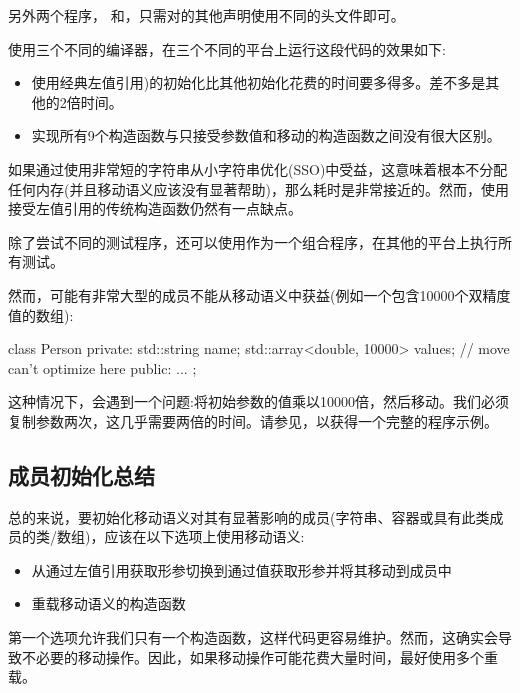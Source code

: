另外两个程序， 和，只需对的其他声明使用不同的头文件即可。

使用三个不同的编译器，在三个不同的平台上运行这段代码的效果如下:

\begin{itemize}
	\item 使用经典左值引用)的初始化比其他初始化花费的时间要多得多。差不多是其他的2倍时间。
	\item 实现所有9个构造函数与只接受参数值和移动的构造函数之间没有很大区别。
\end{itemize}

如果通过使用非常短的字符串从小字符串优化(SSO)中受益，这意味着根本不分配任何内存(并且移动语义应该没有显著帮助)，那么耗时是非常接近的。然而，使用接受左值引用的传统构造函数仍然有一点缺点。

除了尝试不同的测试程序，还可以使用作为一个组合程序，在其他的平台上执行所有测试。

然而，可能有非常大型的成员不能从移动语义中获益(例如一个包含10000个双精度值的数组):

\begin{cppcode}
class Person {
private:
	std::string name;
	std::array<double, 10000> values; // move can’t optimize here
public:
	...
};
\end{cppcode}

这种情况下，会遇到一个问题:将初始参数的值乘以10000倍，然后移动。我们必须复制参数两次，这几乎需要两倍的时间。请参见，以获得一个完整的程序示例。

\subsection{成员初始化总结}

总的来说，要初始化移动语义对其有显著影响的成员(字符串、容器或具有此类成员的类/数组)，应该在以下选项上使用移动语义:

\begin{itemize}
	\item 从通过左值引用获取形参切换到通过值获取形参并将其移动到成员中
	\item 重载移动语义的构造函数
\end{itemize}

第一个选项允许我们只有一个构造函数，这样代码更容易维护。然而，这确实会导致不必要的移动操作。因此，如果移动操作可能花费大量时间，最好使用多个重载。


